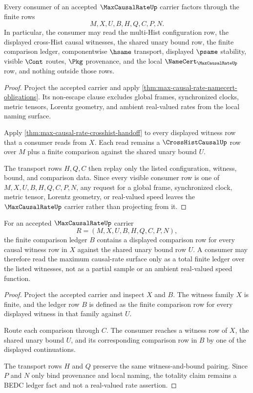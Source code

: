 \begin{theorem}
\label{thm:max-causal-rate-non-escape}
Every consumer of an accepted $\MaxCausalRateUp$ carrier factors through the finite rows
$$
M,X,U,B,H,Q,C,P,N.
$$
In particular, the consumer may read the multi-Hist configuration row, the displayed cross-Hist causal witnesses, the shared unary bound row, the finite comparison ledger, componentwise $\hsame$ transport, displayed $\psame$ stability, visible $\Cont$ routes, $\Pkg$ provenance, and the local $\NameCert_{\MaxCausalRateUp}$ row, and nothing outside those rows.
\end{theorem}
\begin{proof}
Project the accepted carrier and apply \autoref{thm:max-causal-rate-namecert-obligations}. Its non-escape clause excludes global frames, synchronized clocks, metric tensors, Lorentz geometry, and ambient real-valued rates from the local naming surface.

Apply \autoref{thm:max-causal-rate-crosshist-handoff} to every displayed witness row that a consumer reads from $X$. Each read remains a $\CrossHistCausalUp$ row over $M$ plus a finite comparison against the shared unary bound $U$.

The transport rows $H,Q,C$ then replay only the listed configuration, witness, bound, and comparison data. Since every visible consumer row is one of $M,X,U,B,H,Q,C,P,N$, any request for a global frame, synchronized clock, metric tensor, Lorentz geometry, or real-valued speed leaves the $\MaxCausalRateUp$ carrier rather than projecting from it.
\end{proof}

\begin{theorem}
\label{thm:max-causal-rate-bound-comparison-totality}
For an accepted $\MaxCausalRateUp$ carrier
$$
R=(M,X,U,B,H,Q,C,P,N),
$$
the finite comparison ledger $B$ contains a displayed comparison row for every causal witness row in $X$ against the shared unary bound row $U$. A consumer may therefore read the maximum causal-rate surface only as a total finite ledger over the listed witnesses, not as a partial sample or an ambient real-valued speed function.
\end{theorem}
\begin{proof}
Project the accepted carrier and inspect $X$ and $B$. The witness family $X$ is finite, and the ledger row $B$ is defined as the finite comparison row for every displayed witness in that family against $U$.

Route each comparison through $C$. The consumer reaches a witness row of $X$, the shared unary bound $U$, and its corresponding comparison row in $B$ by one of the displayed continuations.

The transport rows $H$ and $Q$ preserve the same witness-and-bound pairing. Since $P$ and $N$ only bind provenance and local naming, the totality claim remains a BEDC ledger fact and not a real-valued rate assertion.
\end{proof}

